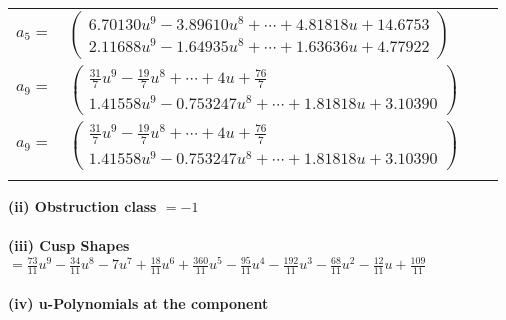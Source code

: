 \documentclass[1p]{elsarticle_modified}
\theoremstyle{definition}
\begin{document}
\begin{tabular}{m{7pt} m{180pt} m{7pt} m{180pt} }
\flushright $a_{5}=$&$\begin{pmatrix}6.70130 u^{9}-3.89610 u^{8}+\cdots+4.81818 u+14.6753\\2.11688 u^{9}-1.64935 u^{8}+\cdots+1.63636 u+4.77922\end{pmatrix}$ \\
\flushright $a_{9}=$&$\begin{pmatrix}\frac{31}{7} u^9-\frac{19}{7} u^8+\cdots+4 u+\frac{76}{7}\\1.41558 u^{9}-0.753247 u^{8}+\cdots+1.81818 u+3.10390\end{pmatrix}$\\ \flushright $a_{9}=$&$\begin{pmatrix}\frac{31}{7} u^9-\frac{19}{7} u^8+\cdots+4 u+\frac{76}{7}\\1.41558 u^{9}-0.753247 u^{8}+\cdots+1.81818 u+3.10390\end{pmatrix}$\\&\end{tabular}
\flushleft \textbf{(ii) Obstruction class $= -1$}\\~\\
\flushleft \textbf{(iii) Cusp Shapes $= \frac{73}{11} u^9-\frac{34}{11} u^8-7 u^7+\frac{18}{11} u^6+\frac{360}{11} u^5-\frac{95}{11} u^4-\frac{192}{11} u^3-\frac{68}{11} u^2-\frac{12}{11} u+\frac{109}{11}$}\\~\\
\newpage\renewcommand{\arraystretch}{1}
\flushleft \textbf{(iv) u-Polynomials at the component}\newline \\
\end{document}
